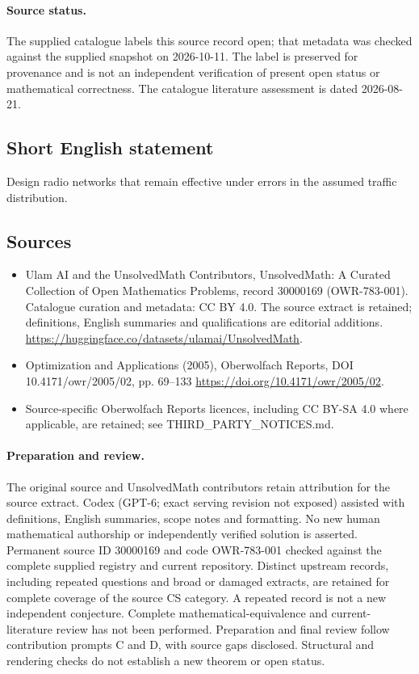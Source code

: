 \documentclass[11pt]{article}
\begin{document}
\paragraph{Source status.}
The supplied catalogue labels this source record open; that metadata was checked against the supplied snapshot on 2026-10-11. The label is preserved for provenance and is not an independent verification of present open status or mathematical correctness. The catalogue literature assessment is dated 2026-08-21.
\subsection{Short English statement}
Design radio networks that remain effective under errors in the assumed traffic distribution.
\subsection{Sources}
\begin{itemize}
\item[S1] Ulam AI and the UnsolvedMath Contributors, UnsolvedMath: A Curated Collection of Open Mathematics Problems, record 30000169 (OWR-783-001). Catalogue curation and metadata: CC BY 4.0. The source extract is retained; definitions, English summaries and qualifications are editorial additions.
\url{https://huggingface.co/datasets/ulamai/UnsolvedMath}.
\item[S2] Optimization and Applications (2005), Oberwolfach Reports, DOI 10.4171/owr/2005/02, pp. 69--133
\url{https://doi.org/10.4171/owr/2005/02}.
\item Source-specific Oberwolfach Reports licences, including CC BY-SA 4.0 where applicable, are retained; see THIRD\_PARTY\_NOTICES.md.
\end{itemize}
\paragraph{Preparation and review.}
The original source and UnsolvedMath contributors retain attribution for the source extract. Codex (GPT-6; exact serving revision not exposed) assisted with definitions, English summaries, scope notes and formatting. No new human mathematical authorship or independently verified solution is asserted. Permanent source ID 30000169 and code OWR-783-001 checked against the complete supplied registry and current repository. Distinct upstream records, including repeated questions and broad or damaged extracts, are retained for complete coverage of the source CS category. A repeated record is not a new independent conjecture. Complete mathematical-equivalence and current-literature review has not been performed. Preparation and final review follow contribution prompts C and D, with source gaps disclosed. Structural and rendering checks do not establish a new theorem or open status.
\label{end:30000169}
\end{document}
